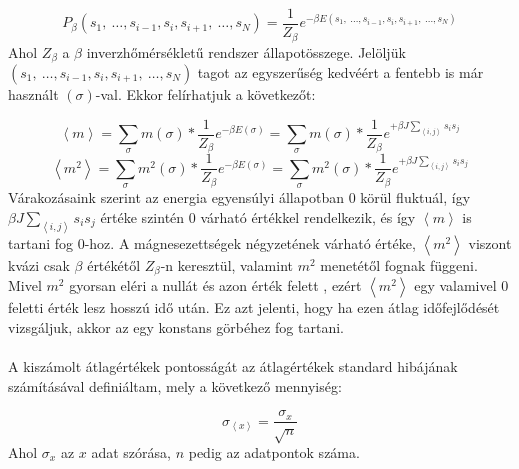 \begin{equation} \label{eq:5}
    P_{\beta} \left( s_{1},\ \dots, s_{i-1}, s_{i} , s_{i+1},\ \dots, s_{N} \right)
    =
    \frac{1}{Z_{\beta}} e^{- \beta E \left( s_{1},\ \dots, s_{i-1}, s_{i} , s_{i+1},\ \dots, s_{N} \right)}
\end{equation}
Ahol $Z_{\beta}$ a $\beta$ inverzhőmérsékletű rendszer állapotösszege. Jelöljük $\left( s_{1},\ \dots, s_{i-1}, s_{i} , s_{i+1},\ \dots, s_{N} \right)$ tagot az egyszerűség kedvéért a fentebb is már használt $\left( \sigma \right)$-val. Ekkor felírhatjuk a következőt:

\begin{equation} \label{eq:6}
    \left< m \right>
    =
    \sum_{\sigma} m \left( \sigma \right) * \frac{1}{Z_{\beta}} e^{- \beta E \left( \sigma \right)}
    =
    \sum_{\sigma} m \left( \sigma \right) * \frac{1}{Z_{\beta}} e^{+ \beta J \sum_{\left< i,j \right>} s_{i} s_{j}}
\end{equation}
\begin{equation} \label{eq:7}
    \left< m^{2} \right>
    =
    \sum_{\sigma} m^{2} \left( \sigma \right) * \frac{1}{Z_{\beta}} e^{- \beta E \left( \sigma \right)}
    =
    \sum_{\sigma} m^{2} \left( \sigma \right) * \frac{1}{Z_{\beta}} e^{+ \beta J \sum_{\left< i,j \right>} s_{i} s_{j}}
\end{equation}
Várakozásaink szerint az energia egyensúlyi állapotban $0$ körül fluktuál, így $\beta J \sum_{\left< i,j \right>} s_{i} s_{j}$ értéke szintén $0$ várható értékkel rendelkezik, és így $\left< m \right>$ is tartani fog $0$-hoz. A mágnesezettségek négyzetének várható értéke, $\left< m^{2} \right>$ viszont kvázi csak $\beta$ értékétől $Z_{\beta}$-n keresztül, valamint $m^{2}$ menetétől fognak függeni. Mivel $m^{2}$ gyorsan eléri a nullát és azon érték felett , ezért $\left< m^{2} \right>$ egy valamivel $0$ feletti érték lesz hosszú idő után. Ez azt jelenti, hogy ha ezen átlag időfejlődését vizsgáljuk, akkor az egy konstans görbéhez fog tartani.
\\ \\
A kiszámolt átlagértékek pontosságát az átlagértékek standard hibájának számításával definiáltam, mely a következő mennyiség:

\begin{equation} \label{eq:8}
    \sigma_{\left< x \right>}
    =
    \frac{\sigma_{x}}{\sqrt{n}}
\end{equation}
Ahol $\sigma_{x}$ az $x$ adat szórása, $n$ pedig az adatpontok száma.

